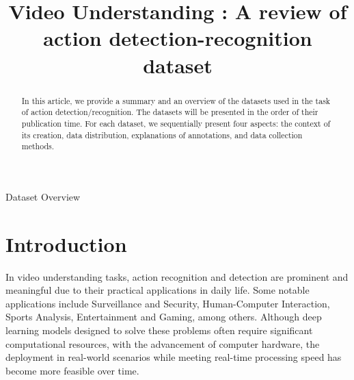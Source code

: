 \documentclass[conference]{IEEEtran}
\begin{document}
\title{Video Understanding : A review of action detection-recognition dataset}

\author{
\and
{}
\and
{}
}

\maketitle

\begin{abstract}
In this article, we provide a summary and an overview of the datasets used in the task of action detection/recognition. The datasets will be presented in the order of their publication time. For each dataset, we sequentially present four aspects: the context of its creation, data distribution, explanations of annotations, and data collection methods. \\
\end{abstract}

\begin{IEEEkeywords}
Dataset Overview 
\end{IEEEkeywords}

\section{Introduction}
In video understanding tasks, action recognition and detection are prominent and meaningful due to their practical applications in daily life. Some notable applications include Surveillance and Security, Human-Computer Interaction, Sports Analysis, Entertainment and Gaming, among others. Although deep learning models designed to solve these problems often require significant computational resources, with the advancement of computer hardware, the deployment in real-world scenarios while meeting real-time processing speed has become more feasible over time.
\end{document}
